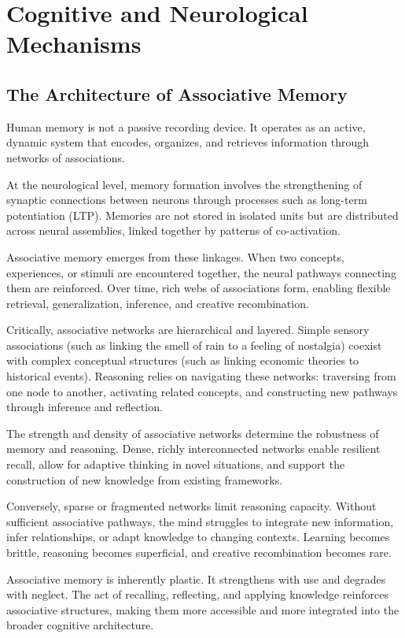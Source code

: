 \chapter{Cognitive and Neurological Mechanisms}

\section{The Architecture of Associative Memory}

Human memory is not a passive recording device. It operates as an
active, dynamic system that encodes, organizes, and retrieves
information through networks of associations.

At the neurological level, memory formation involves the strengthening
of synaptic connections between neurons through processes such as
long-term potentiation (LTP). Memories are not stored in isolated units
but are distributed across neural assemblies, linked together by
patterns of co-activation.

Associative memory emerges from these linkages. When two concepts,
experiences, or stimuli are encountered together, the neural pathways
connecting them are reinforced. Over time, rich webs of associations
form, enabling flexible retrieval, generalization, inference, and
creative recombination.

Critically, associative networks are hierarchical and layered. Simple
sensory associations (such as linking the smell of rain to a feeling of
nostalgia) coexist with complex conceptual structures (such as linking
economic theories to historical events). Reasoning relies on navigating
these networks: traversing from one node to another, activating related
concepts, and constructing new pathways through inference and
reflection.

The strength and density of associative networks determine the
robustness of memory and reasoning. Dense, richly interconnected
networks enable resilient recall, allow for adaptive thinking in novel
situations, and support the construction of new knowledge from existing
frameworks.

Conversely, sparse or fragmented networks limit reasoning capacity.
Without sufficient associative pathways, the mind struggles to integrate
new information, infer relationships, or adapt knowledge to changing
contexts. Learning becomes brittle, reasoning becomes superficial, and
creative recombination becomes rare.

Associative memory is inherently plastic. It strengthens with use and
degrades with neglect. The act of recalling, reflecting, and applying
knowledge reinforces associative structures, making them more accessible
and more integrated into the broader cognitive architecture.

